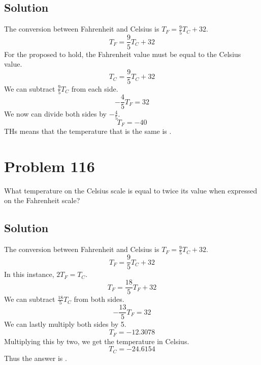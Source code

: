 \documentclass[11pt]{report}
\begin{document}
\subsection{Solution}
The conversion between Fahrenheit and Celsius is $T_F = \frac{9}{5} T_C + 32$. 
\[T_F = \frac{9}{5} T_C + 32\]
For the proposed to hold, the Fahrenheit value must be equal to the Celsius value.
\[T_C = \frac{9}{5} T_C + 32\]
We can subtract $\frac{9}{5} T_C$ from each side.
\[-\frac{4}{5} T_F = 32\]
We now can divide both sides by $-\frac{4}{5}$.
\[T_F = -40\]
THs means that the temperature that is the same is \boxed{-40\unit{\degreeCelsius}}.


\section{Problem 116}
What temperature on the Celsius scale is equal to twice its value when expressed on the Fahrenheit scale?

\subsection{Solution}
The conversion between Fahrenheit and Celsius is $T_F = \frac{9}{5} T_C + 32$.
\[ T_F = \frac{9}{5} T_C + 32 \]
In this instance, $2T_F = T_C$.
\[ T_F = \frac{18}{5}T_F + 32 \]
We can subtract $\frac{18}{5}T_C$ from both sides.
\[ -\frac{13}{5}T_F = 32 \]
We can lastly multiply both sides by 5.
\[ T_F = -12.3078 \]
Multiplying this by two, we get the temperature in Celsius.
\[ T_C = -24.6154 \]
Thus the answer is \boxed{-24.6154\unit{\celsius}}.
\end{document}
